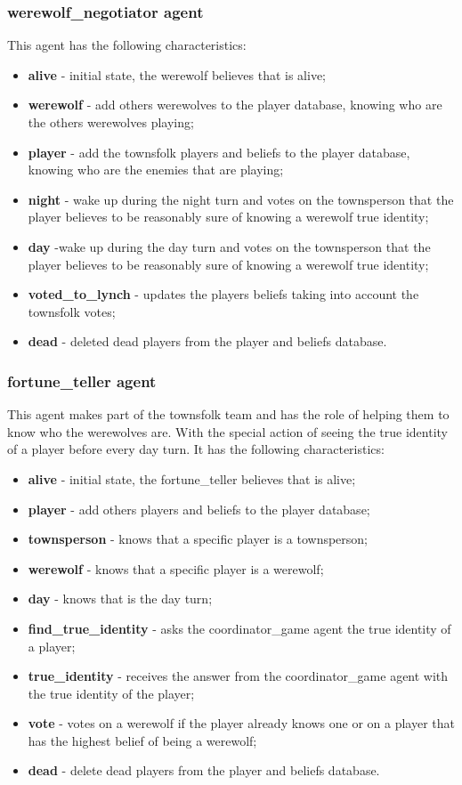 \documentclass{article}
\begin{document}
\subsubsection{werewolf\_negotiator agent}
This agent has the following characteristics:
\begin{itemize}
	\item \textbf{alive} - initial state, the werewolf believes that is alive;
	\item \textbf{werewolf} - add others werewolves to the player database, knowing who are the others werewolves playing;
	\item \textbf{player} - add the townsfolk players and beliefs to the player database, knowing who are the enemies that are playing;
	\item \textbf{night} - wake up during the night turn and votes on the townsperson that the player believes to be reasonably sure of knowing a werewolf true identity;
	\item \textbf{day} -wake up during the day turn and votes on the townsperson that the player believes to be reasonably sure of knowing a werewolf true identity;
	\item \textbf{voted\_to\_lynch} - updates the players beliefs taking into account the townsfolk votes;
	\item \textbf{dead} - deleted dead players from the player and beliefs database.
\end{itemize}

\subsubsection{fortune\_teller agent}
This agent makes part of the townsfolk team and has the role of helping them to know who the werewolves are. With the special action of seeing the true identity of a player before every day turn.
It has the following characteristics:
\begin{itemize}
	\item \textbf{alive} - initial state, the fortune\_teller believes that is alive;
	\item \textbf{player} - add others players and beliefs to the player database;
	\item \textbf{townsperson} - knows that a specific player is a townsperson;
	\item \textbf{werewolf} - knows that a specific player is a werewolf;
	\item \textbf{day} - knows that is the day turn;
	\item \textbf{find\_true\_identity} - asks the coordinator\_game agent the true identity of a player;
	\item \textbf{true\_identity} - receives the answer from the coordinator\_game agent with the true identity of the player;
	\item \textbf{vote} - votes on a werewolf if the player already knows one or on a player that has the highest belief of being a werewolf;
	\item \textbf{dead} - delete dead players from the player and beliefs database.
\end{itemize} 
\end{document}

